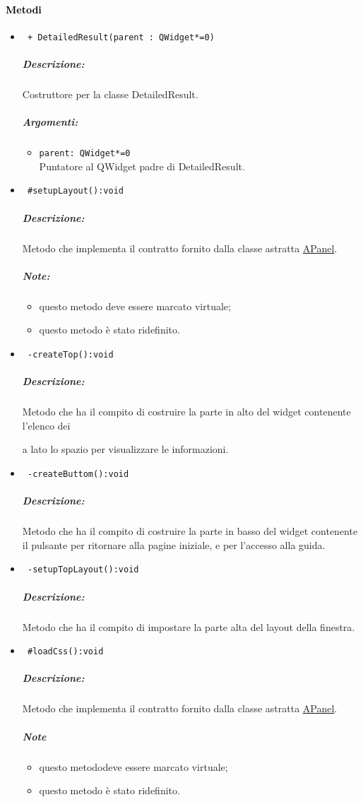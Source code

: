 \paragraph{\textcolor{black}{Metodi\\}}
\begin{itemize}
\item\color{blue}\verb! + DetailedResult(parent : QWidget*=0)!
\color{black}
\subparagraph{Descrizione:} Costruttore per la classe DetailedResult. 
\subparagraph{Argomenti:}
\begin{itemize}
\item \color{RoyalPurple}\verb!parent: QWidget*=0 ! \\ Puntatore al QWidget padre di DetailedResult.
\end{itemize}

\item\color{blue}\verb! #setupLayout():void!
\color{black}
\subparagraph{Descrizione:} Metodo che implementa il contratto fornito dalla classe astratta \hyperref[speAPanel]{APanel}.
\subparagraph{Note:}
\begin{itemize}
\item questo metodo deve essere marcato virtuale;
\item questo metodo è stato ridefinito.
\end{itemize}
 
\item\color{blue}\verb! -createTop():void!
\color{black}
\subparagraph{Descrizione:} Metodo che ha il compito di costruire la parte in alto del widget contenente l'elenco dei \subject e a lato lo spazio per visualizzare le informazioni.
 
\item\color{blue}\verb! -createButtom():void!
\color{black}
\subparagraph{Descrizione:} Metodo che ha il compito di costruire la parte in basso del widget contenente il pulsante per ritornare alla pagine iniziale, e per l'accesso alla guida.

\item\color{blue}\verb! -setupTopLayout():void!
\color{black}
\subparagraph{Descrizione:} Metodo che ha il compito di impostare la parte alta del layout della finestra.
  
\item\color{blue}\verb! #loadCss():void!
\color{black}
\subparagraph{Descrizione:} Metodo che implementa il contratto fornito dalla classe astratta \hyperref[speAPanel]{APanel}.
 \subparagraph{Note}
 \begin{itemize}
  \item questo metododeve essere marcato virtuale;
 \item questo metodo è stato ridefinito.
 \end{itemize}
 

\end{itemize}
